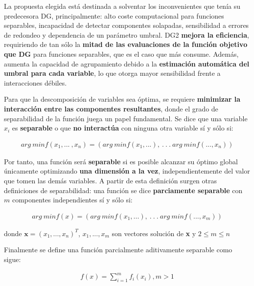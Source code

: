 La propuesta elegida está destinada a solventar los inconvenientes que tenía su predecesora DG, principalmente: alto coste computacional para funciones separables, incapacidad de detectar componentes solapadas, sensibilidad a errores de redondeo y dependencia de un parámetro umbral. DG2 \textbf{mejora la eficiencia}, requiriendo de tan sólo la \textbf{mitad de las evaluaciones de la función objetivo que DG} para funciones separables, que es el caso que más consume. Además, aumenta la capacidad de agrupamiento debido a la \textbf{estimación automática del umbral para cada variable}, lo que otorga mayor sensibilidad frente a interacciones débiles.

Para que la descomposición de variables sea óptima, se requiere \textbf{minimizar la interacción entre las componentes resultantes}, donde el grado de separabilidad de la función juega un papel fundamental. Se dice que una variable $x_i$ es \textbf{separable} o que \textbf{no interactúa} con ninguna otra variable\cite{DG} sí y sólo si:

\begin{equation}\label{eq:separable}
	\begin{gathered}
	arg \ minf(x_1,...\ ,x_n) = (arg \ min f(x_1,...), \ . \ . \ . \ arg \ min f(...,x_n))
	\end{gathered}
\end{equation}
 
Por tanto, una función será \textbf{separable} si es posible alcanzar su óptimo global únicamente optimizando \textbf{una dimensión a la vez}, independientemente del valor que tomen las demás variables. A partir de esta definición surgen otras definiciones de separabilidad: una función se dice \textbf{parciamente separable} con $m$ componentes independientes sí y sólo si:

\begin{equation}\label{eq:partSeparable}
	\begin{gathered}
		arg \ minf(x) = (arg \ min f(x_1,...), \ . \ . \ . \ arg \ min f(...,x_m))
	\end{gathered}
\end{equation}

donde $\textbf{x}=(x_1,...,x_n)^T$, $x_1,...,x_m$ son vectores solución de \textbf{x} y $2 \leq m \leq n$

Finalmente se define una función parcialmente aditivamente separable como sigue:

\begin{equation}\label{eq:addPartSeparable}
	\begin{gathered}
		f(x) = \sum_{i=1}^{m} f_i(x_i), m > 1
	\end{gathered}
\end{equation}

